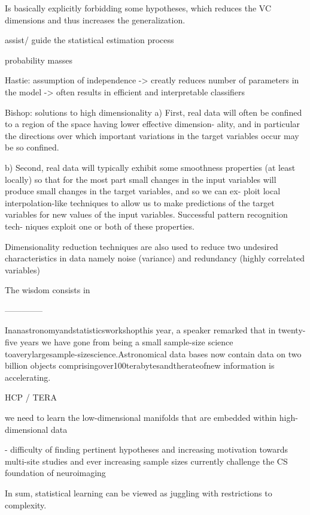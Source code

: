 \documentclass[authoryear,review,3p]{elsarticle}
\begin{document}
Is basically explicitly forbidding some hypotheses, which reduces the VC dimensions and thus increases the generalization.

assist/
guide the statistical estimation process

probability masses


Hastie: assumption of independence -> creatly reduces number of parameters in the model -> often results in efficient and interpretable classifiers


Bishop: solutions to high dimensionality
a) First, real data will often be confined to a region of the space having lower effective dimension- ality, and in particular the directions over which important variations in the target variables occur may be so confined.

b) Second, real data will typically exhibit some smoothness properties (at least locally) so that for the most part small changes in the input variables will produce small changes in the target variables, and so we can ex- ploit local interpolation-like techniques to allow us to make predictions of the target variables for new values of the input variables. Successful pattern recognition tech- niques exploit one or both of these properties. 

Dimensionality reduction techniques are also used to reduce two undesired characteristics in data namely noise (variance) and redundancy (highly correlated variables)




The wisdom consists in


--------------

Inanastronomyandstatisticsworkshopthis year, a speaker remarked that in twenty-five years we have gone from being a small sample-size science toaverylargesample-sizescience.Astronomical data bases now contain data on two billion objects comprisingover100terabytesandtherateofnew information is accelerating.

HCP / TERA

we need to learn
the low-dimensional manifolds that are
embedded within high-dimensional data



- difficulty of finding pertinent hypotheses and increasing motivation towards multi-site studies and ever increasing sample sizes currently challenge the CS foundation of neuroimaging


In sum,
statistical learning can be viewed as juggling with
restrictions to complexity.
\end{document}
